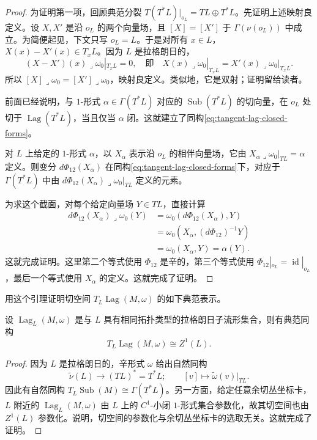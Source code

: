 \begin{proof}
为证明第一项，回顾典范分裂
$T(T^*L)|_{o_L}=TL\oplus T^*L$。先证明上述映射良定义。设 $X,X'$ 是沿
$o_L$ 的两个向量场，且 $[X]=[X']$ 于 $\Gamma(\nu(o_L))$ 中成立。为简便起见，下文只写 $o_L=L$。于是对所有 $x\in L$，
$X(x)-X'(x)\in T_xL$。因为 $L$ 是拉格朗日的，
\[
 (X-X')(x)\mathbin{\lrcorner}\omega_0|_{T_xL}=0,
 \quad\text{即}\quad
 X(x)\mathbin{\lrcorner}\omega_0|_{T_xL}
 =X'(x)\mathbin{\lrcorner}\omega_0|_{T_xL}.
\]
所以 $[X]\mathbin{\lrcorner}\omega_0=[X']\mathbin{\lrcorner}\omega_0$，映射良定义。类似地，它是双射；证明留给读者。

前面已经说明，与 $1$-形式 $\alpha\in\Gamma(T^*L)$ 对应的
$\operatorname{Sub}(T^*L)$ 的切向量，在 $o_L$ 处切于
$\operatorname{Lag}(T^*L)$，当且仅当 $\alpha$ 闭。这就建立了同构\eqref{eq:tangent-lag-closed-forms}。

对 $L$ 上给定的 $1$-形式 $\alpha$，以 $X_\alpha$ 表示沿 $o_L$ 的相伴向量场，它由
$X_\alpha\mathbin{\lrcorner}\omega_0|_{TL}=\alpha$ 定义。则变分
$d\Phi_{12}(X_\alpha)$ 在同构\eqref{eq:tangent-lag-closed-forms}下，对应于
$\Gamma(T^*L)$ 中由
$d\Phi_{12}(X_\alpha)\mathbin{\lrcorner}\omega_0|_{TL}$ 定义的元素。

为求这个截面，对每个给定向量场 $Y\in TL$，直接计算
\[
\begin{aligned}
 d\Phi_{12}(X_\alpha)\mathbin{\lrcorner}\omega_0(Y)
 &=\omega_0(d\Phi_{12}(X_\alpha),Y)\\
 &=\omega_0(X_\alpha,(d\Phi_{12})^{-1}Y)\\
 &=\omega_0(X_\alpha,Y)=\alpha(Y).
\end{aligned}
\]
这就完成证明。这里第二个等式使用 $\Phi_{12}$ 是辛的，第三个等式使用
$\Phi_{12}|_{o_L}=\operatorname{id}|_{o_L}$，最后一个等式使用 $X_\alpha$ 的定义。这就完成了证明。
\end{proof}

用这个引理证明切空间 $T_L\operatorname{Lag}(M,\omega)$ 的如下典范表示。

\begin{proposition}\label{prop:tangent-lag-closed-forms}
设 $\operatorname{Lag}_L(M,\omega)$ 是与 $L$ 具有相同拓扑类型的拉格朗日子流形集合，则有典范同构
\[
 T_L\operatorname{Lag}(M,\omega)\cong Z^1(L).
\]
\end{proposition}

\begin{proof}
因为 $L$ 是拉格朗日的，辛形式 $\omega$ 给出自然同构
\[
 \widetilde\nu(L)\longrightarrow(TL)^*=T^*L;\qquad
 [v]\longmapsto\widetilde\omega(v)|_{TL}.
\]
因此有自然同构
$T_L\operatorname{Sub}(M)\cong\Gamma(T^*L)$。另一方面，给定任意余切丛坐标卡，$L$ 附近的
$\operatorname{Lag}_L(M,\omega)$ 由 $L$ 上的 $C^1$-小闭 $1$-形式集合参数化，故其切空间也由 $Z^1(L)$ 参数化。说明，切空间的参数化与余切丛坐标卡的选取无关。这就完成了证明。
\end{proof}

